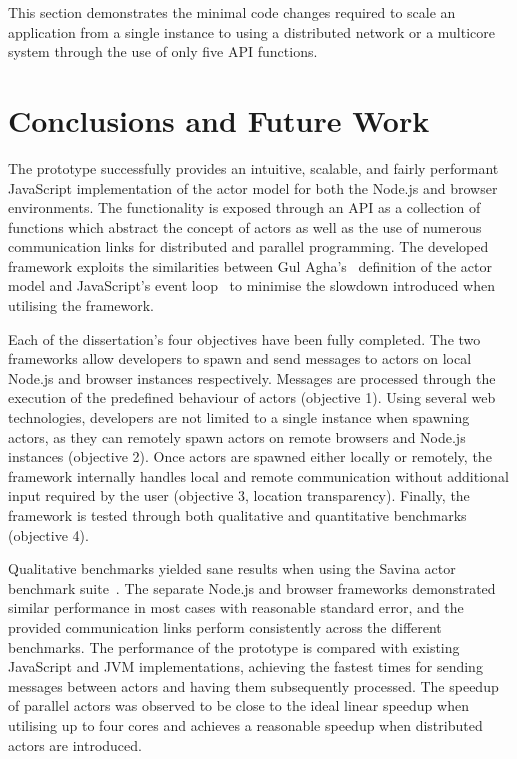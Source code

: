 \documentclass[oneside]{um-fict}
\begin{document}
This section demonstrates the minimal code changes required to scale an application from a single instance to using a distributed network or a multicore system through the use of only five API functions.
\chapter{Conclusions and Future Work}\label{chap:conclusions}
The prototype successfully provides an intuitive, scalable, and fairly performant JavaScript implementation of the actor model for both the Node.js and browser environments. The functionality is exposed through an API as a collection of functions which abstract the concept of actors as well as the use of numerous communication links for distributed and parallel programming. The developed framework exploits the similarities between Gul Agha's~\cite{agha1985actors} definition of the actor model and JavaScript's event loop~\cite{eventloopbrowser}\cite{eventloopnode} to minimise the slowdown introduced when utilising the framework. 

Each of the dissertation's four objectives have been fully completed. The two frameworks allow developers to spawn and send messages to actors on local Node.js and browser instances respectively. Messages are processed through the execution of the predefined behaviour of actors (objective 1). Using several web technologies, developers are not limited to a single instance when spawning actors, as they can remotely spawn actors on remote browsers and Node.js instances (objective 2). Once actors are spawned either locally or remotely, the framework internally handles local and remote communication without additional input required by the user (objective 3, location transparency). Finally, the framework is tested through both qualitative and quantitative benchmarks (objective 4).

Qualitative benchmarks yielded sane results when using the Savina actor benchmark suite~\cite{savina}. The separate Node.js and browser frameworks demonstrated similar performance in most cases with reasonable standard error, and the provided communication links perform consistently across the different benchmarks. The performance of the prototype is compared with existing JavaScript and JVM implementations, achieving the fastest times for sending messages between actors and having them subsequently processed. The speedup of parallel actors was observed to be close to the ideal linear speedup when utilising up to four cores and achieves a reasonable speedup when distributed actors are introduced. 
\end{document}
